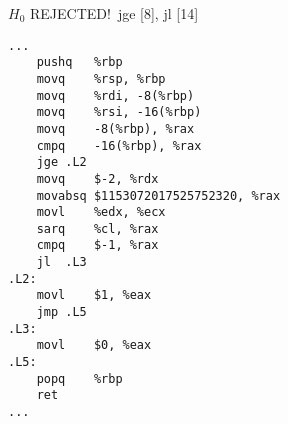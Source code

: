 \begin{figure}[H]
\begin{subfigure}[T]{0.30333333333333334\textwidth}
\begin{lrbox}{\mybox}
%
        \end{lrbox}\resizebox{\textwidth}{!}{\usebox{\mybox}}
\end{subfigure}
\begin{subfigure}[T]{0.30333333333333334\textwidth}
\caption*{}
\end{subfigure}
\begin{subfigure}[T]{0.30333333333333334\textwidth}
\caption*{}
\end{subfigure}
\hspace*{6mm}
\begin{subfigure}[T]{0.2733333333333333\textwidth}
\vspace*{2mm}\tiny {\color{red}$H_0$ REJECTED!}\ \vspace*{2mm}\tiny jge [8], jl [14]
\begin{lstlisting}[style=defstyle,language={[x86masm]Assembler},basicstyle=\tiny\ttfamily,breaklines=true]
...
	pushq	%rbp
	movq	%rsp, %rbp
	movq	%rdi, -8(%rbp)
	movq	%rsi, -16(%rbp)
	movq	-8(%rbp), %rax
	cmpq	-16(%rbp), %rax
	jge	.L2
	movq	$-2, %rdx
	movabsq	$1153072017525752320, %rax
	movl	%edx, %ecx
	sarq	%cl, %rax
	cmpq	$-1, %rax
	jl	.L3
.L2:
	movl	$1, %eax
	jmp	.L5
.L3:
	movl	$0, %eax
.L5:
	popq	%rbp
	ret
...\end{lstlisting}
\end{subfigure}
\end{figure}
\newpage\noindent
